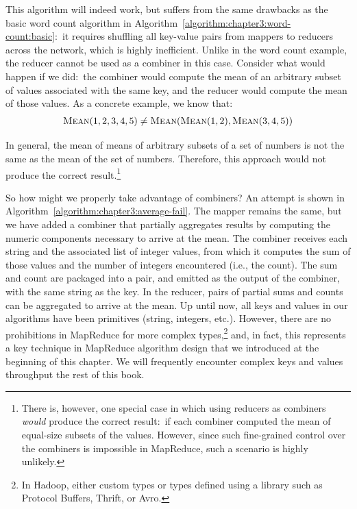 \documentclass[11pt]{article}
\begin{document}
This algorithm will indeed work, but suffers from the same drawbacks
as the basic word count algorithm in
Algorithm~\ref{algorithm:chapter3:word-count:basic}:\ it requires shuffling
all key-value pairs from mappers to reducers across the network, which
is highly inefficient.  Unlike in the word count example, the reducer
cannot be used as a combiner in this case.  Consider what would happen
if we did:\ the combiner would compute the mean of an arbitrary subset
of values associated with the same key, and the reducer would compute
the mean of those values.  As a concrete example, we know that:
\begin{align}
\textsc{Mean}(1, 2, 3, 4, 5) \ne \textsc{Mean}( \textsc{Mean}(1, 2), \textsc{Mean}(3, 4, 5))
\end{align}

\noindent In general, the mean of means of arbitrary subsets of a set
of numbers is not the same as the mean of the set of numbers.
Therefore, this approach would not produce the correct
result.\footnote{There is, however, one special case in which using
  reducers as combiners \emph{would} produce the correct result:\ if
  each combiner computed the mean of equal-size subsets of the values.
  However, since such fine-grained control over the combiners is
  impossible in MapReduce, such a scenario is highly unlikely.}

So how might we properly take advantage of combiners?  An attempt is
shown in Algorithm~\ref{algorithm:chapter3:average-fail}.  The mapper
remains the same, but we have added a combiner that partially
aggregates results by computing the numeric components necessary to
arrive at the mean.  The combiner receives each string and the
associated list of integer values, from which it computes the sum of
those values and the number of integers encountered (i.e., the count).
The sum and count are packaged into a pair, and emitted as the output
of the combiner, with the same string as the key.  In the reducer,
pairs of partial sums and counts can be aggregated to arrive at the
mean.  Up until now, all keys and values in our algorithms have been
primitives (string, integers, etc.).  However, there are no
prohibitions in MapReduce for more complex types,\footnote{In Hadoop,
  either custom types or types defined using a library such as
  Protocol Buffers, Thrift, or Avro.} and, in fact, this represents a
key technique in MapReduce algorithm design that we introduced at the
beginning of this chapter.  We will frequently encounter complex keys
and values throughput the rest of this book.
\end{document}
